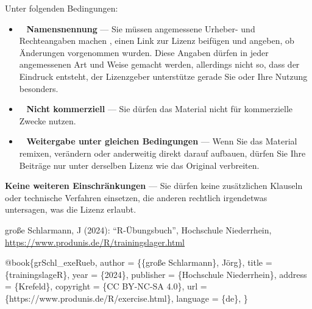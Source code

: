 \documentclass[
  11pt,
  a4paperpaper,
]{scrreprt}
\newenvironment{Shaded}{\begin{snugshade}}{\end{snugshade}}
\newcommand{\DataTypeTok}[1]{\textcolor[rgb]{0.68,0.00,0.00}{#1}}
\newcommand{\NormalTok}[1]{\textcolor[rgb]{0.00,0.23,0.31}{#1}}
\newcommand{\OtherTok}[1]{\textcolor[rgb]{0.00,0.23,0.31}{#1}}
\newcommand{\VariableTok}[1]{\textcolor[rgb]{0.07,0.07,0.07}{#1}}
\providecommand{\tightlist}{%
  \setlength{\itemsep}{0pt}\setlength{\parskip}{0pt}}\usepackage{longtable,booktabs,array}
\begin{document}
Unter folgenden Bedingungen:

\begin{itemize}
\tightlist
\item
  \ccAttribution~ \textbf{Namensnennung} --- Sie müssen angemessene
  Urheber- und Rechteangaben machen , einen Link zur Lizenz beifügen und
  angeben, ob Änderungen vorgenommen wurden. Diese Angaben dürfen in
  jeder angemessenen Art und Weise gemacht werden, allerdings nicht so,
  dass der Eindruck entsteht, der Lizenzgeber unterstütze gerade Sie
  oder Ihre Nutzung besonders.
\item
  \ccNonCommercialEU~ \textbf{Nicht kommerziell} --- Sie dürfen das
  Material nicht für kommerzielle Zwecke nutzen.
\item
  \ccShareAlike~ \textbf{Weitergabe unter gleichen Bedingungen} --- Wenn
  Sie das Material remixen, verändern oder anderweitig direkt darauf
  aufbauen, dürfen Sie Ihre Beiträge nur unter derselben Lizenz wie das
  Original verbreiten.
\end{itemize}

\textbf{Keine weiteren Einschränkungen} --- Sie dürfen keine
zusätzlichen Klauseln oder technische Verfahren einsetzen, die anderen
rechtlich irgendetwas untersagen, was die Lizenz erlaubt.

\vfill

\begin{tcolorbox}[enhanced jigsaw, breakable, left=2mm, colbacktitle=quarto-callout-tip-color!10!white, coltitle=black, colframe=quarto-callout-tip-color-frame, arc=.35mm, toptitle=1mm, opacitybacktitle=0.6, rightrule=.15mm, opacityback=0, toprule=.15mm, bottomrule=.15mm, colback=white, title=\textcolor{quarto-callout-tip-color}{\faLightbulb}\hspace{0.5em}{\textbf{Zitationsvorschlag}}, leftrule=.75mm, titlerule=0mm, bottomtitle=1mm]

große Schlarmann, J (2024): ``R-Übungsbuch'', Hochschule Niederrhein,
\url{https://www.produnis.de/R/trainingslager.html}

\scriptsize

\begin{Shaded}
\begin{Highlighting}[]
\VariableTok{@book}\NormalTok{\{}\OtherTok{grSchl\_exeRueb}\NormalTok{,}
    \DataTypeTok{author}\NormalTok{ = \{\{große Schlarmann\}, Jörg\},}
    \DataTypeTok{title}\NormalTok{ = \{trainingslageR\},}
    \DataTypeTok{year}\NormalTok{ = \{2024\},}
    \DataTypeTok{publisher}\NormalTok{ = \{Hochschule Niederrhein\},}
    \DataTypeTok{address}\NormalTok{ = \{Krefeld\},}
    \DataTypeTok{copyright}\NormalTok{ = \{CC BY{-}NC{-}SA 4.0\},}
    \DataTypeTok{url}\NormalTok{ = \{https://www.produnis.de/R/exercise.html\},}
    \DataTypeTok{language}\NormalTok{ = \{de\},}
\NormalTok{\}}
\end{Highlighting}
\end{Shaded}

\end{tcolorbox}
\end{document}
